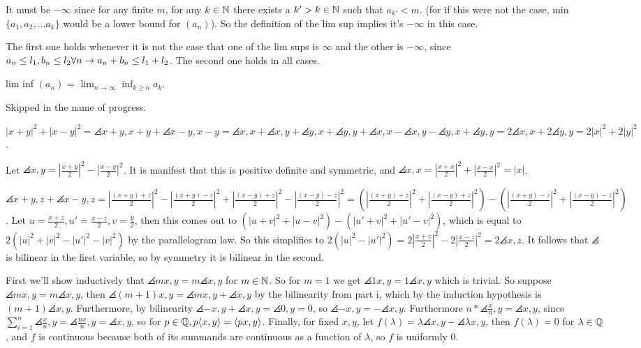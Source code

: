 \documentclass[11pt, oneside]{article}   	%
\begin{document}
\item It must be $-\infty$ since for any finite $m$, for any $k \in \mathbb{N}$ there exists a $k' > k \in \mathbb{N}$ such that $a_{k'} < m$. (for if this were not the case, min$\{a_1, a_2, \ldots a_k\}$ would be a lower bound for $(a_n)$). So the definition of the lim sup implies it's $-\infty$ in this case.
\item The first one holds whenever it is not the case that one of the lim sups is $\infty$ and the other is $-\infty$, since $a_n \le l_1, b_n \le l_2 \forall n \rightarrow a_n + b_n \le l_1 + l_2$. The second one holds in all cases.
\item lim inf $(a_n)$ = $\lim_{n \to \infty}\inf_{k \ge n}a_k$.
\ee
\item Skipped in the name of progress.
\item \be
\item $|x + y|^2 + |x-y|^2 = \angles{x+y, x+y} + \angles{x-y, x-y} = \angles{x, x} + \angles{x, y} + \angles{y, x} + \angles{y, y} + \angles{x, x} - \angles{x, y} - \angles{y, x} + \angles{y, y} = 2\angles{x, x} + 2\angles{y, y} = 2|x|^2 + 2|y|^2$.
\item Let $\angles{x, y} = |\frac{x + y}{2}|^2 - |\frac{x-y}{2}|^2$. It is manifest that this is positive definite and symmetric, and $\angles{x, x} = |\frac{x+x}{2}|^2 + |\frac{x - x}{2}|^2 = |x|$. 
\be
\item $\angles{x + y, z} + \angles{x - y, z} = |\frac{(x + y) + z}{2}|^2 - |\frac{(x + y) - z}{2}|^2 + |\frac{(x - y) + z}{2}|^2 - |\frac{(x - y) - z}{2}|^2 = (|\frac{(x + y) + z}{2}|^2 + |\frac{(x - y) + z}{2}|^2) - (|\frac{(x + y) - z}{2}|^2 +  |\frac{(x - y) - z}{2}|^2)$. Let $u = \frac{x + z}{2}, u' = \frac{x-z}{2}, v = \frac{y}{2}$, then this comes out to $(|u + v|^2 + |u - v|^2) - (|u' + v|^2 + |u' - v|^2)$, which is equal to $2(|u|^2 + |v|^2 - |u'|^2 - |v|^2)$ by the parallelogram law. So this simplifies to $2(|u|^2 - |u'|^2) = 2|\frac{x + z}{2}|^2 - 2|\frac{x - z}{2}|^2 = 2\angles{x, z}$. It follows that $\angles{}$ is bilinear in the first variable, so by symmetry it is bilinear in the second.
\item First we'll show inductively that $\angles{mx, y} = m\angles{x, y}$ for $m \in \mathbb{N}$. So for $m=1$ we get $\angles{1x, y} = 1\angles{x, y}$ which is trivial. So suppose $\angles{mx, y} = m\angles{x, y}$, then $\angles{(m+1)x, y} = \angles{mx, y} + \angles{x, y}$ by the bilinearity from part i, which by the induction hypothesis is $(m+1)\angles{x, y}$. Furthermore, by bilinearity $\angles{-x, y} + \angles{x, y} = \angles{0, y} = 0$, so $\angles{-x, y} = -\angles{x, y}$. Furthermore $n * \angles{\frac{x}{n}, y} = \angles{x, y}$, since $\sum_{i=1}^n\angles{\frac{x}{n}, y} = \angles{\frac{nx}{n}, y} = \angles{x, y}$, so for $p \in \mathbb{Q}, p\langle x, y \rangle = \langle px, y \rangle$. Finally, for fixed $x, y$, let $f(\lambda) = \lambda\angles{x, y} - \angles{\lambda x, y}$, then $f(\lambda) = 0$ for $\lambda \in \mathbb{Q}$, and $f$ is continuous because both of its summands are continuous as a function of $\lambda$, so $f$ is uniformly 0.
\ee
\ee
\ee
\end{document}
